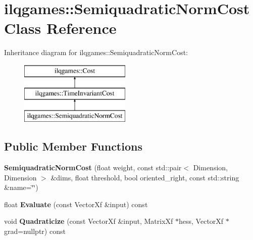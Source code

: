 \hypertarget{classilqgames_1_1_semiquadratic_norm_cost}{}\section{ilqgames\+:\+:Semiquadratic\+Norm\+Cost Class Reference}
\label{classilqgames_1_1_semiquadratic_norm_cost}
Inheritance diagram for ilqgames\+:\+:Semiquadratic\+Norm\+Cost\+:\begin{figure}[H]
\begin{center}
\leavevmode
\includegraphics[height=3.000000cm]{classilqgames_1_1_semiquadratic_norm_cost}
\end{center}
\end{figure}
\subsection*{Public Member Functions}
\begin{DoxyCompactItemize}
\item 
{\bfseries Semiquadratic\+Norm\+Cost} (float weight, const std\+::pair$<$ Dimension, Dimension $>$ \&dims, float threshold, bool oriented\+\_\+right, const std\+::string \&name=\char`\"{}\char`\"{})\hypertarget{classilqgames_1_1_semiquadratic_norm_cost_a1f2f9189770f6128afe12d3a3aed0a7a}{}\label{classilqgames_1_1_semiquadratic_norm_cost_a1f2f9189770f6128afe12d3a3aed0a7a}

\item 
float {\bfseries Evaluate} (const Vector\+Xf \&input) const \hypertarget{classilqgames_1_1_semiquadratic_norm_cost_af8df2f58dc246d0d450f53f4fd9086f2}{}\label{classilqgames_1_1_semiquadratic_norm_cost_af8df2f58dc246d0d450f53f4fd9086f2}

\item 
void {\bfseries Quadraticize} (const Vector\+Xf \&input, Matrix\+Xf $\ast$hess, Vector\+Xf $\ast$grad=nullptr) const \hypertarget{classilqgames_1_1_semiquadratic_norm_cost_ad35dfe1f0729ca73bd68edd3bc23a114}{}\label{classilqgames_1_1_semiquadratic_norm_cost_ad35dfe1f0729ca73bd68edd3bc23a114}

\end{DoxyCompactItemize}

